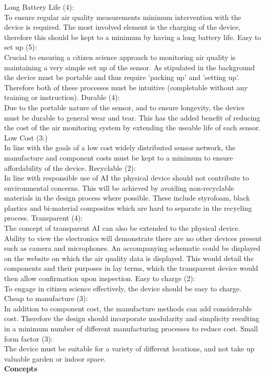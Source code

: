Long Battery Life (4):\\
To ensure regular air quality measurements minimum intervention with the device is required. The most involved element is the charging of the device, therefore this should be kept to a minimum by having a long battery life.
\vskip 0.1in
Easy to set up (5):\\
Crucial to ensuring a citizen science approach to monitoring air quality is maintaining a very simple set up of the sensor. As stipulated in the background the device must be portable and thus require 'packing up' and 'setting up'. Therefore both of these processes must be intuitive (completable without any training or instruction).
\vskip 0.1in
Durable (4):\\
Due to the portable nature of the sensor, and to ensure longevity, the device must be durable to general wear and tear. This has the added benefit of reducing the cost of the air monitoring system by extending the useable life of each sensor.
\vskip 0.1in
Low Cost (3:)\\
In line with the goals of a low cost widely distributed sensor network, the manufacture and component costs must be kept to a minimum to ensure affordability of the device.
\vskip 0.1in
Recyclable (2):\\
In line with responsible use of AI the physical device should not contribute to environmental concerns. This will be achieved by avoiding non-recyclable materials in the design process where possible. These include styrofoam, black plastics and bi-material composites which are hard to separate in the recycling process.
\vskip 0.1in
Transparent (4):\\
The concept of transparent AI can also be extended to the physical device. Ability to view the electronics will demonstrate there are no other devices present such as camera and microphones. An accompanying schematic could be displayed on the website on which the air quality data is displayed. This would detail the components and their purposes in lay terms, which the transparent device would then allow confirmation upon inspection.
\vskip 0.1in
Easy to charge (2):\\
To engage in citizen science effectively, the device should be easy to charge.
\vskip 0.1in
Cheap to manufacture (3):\\
In addition to component cost, the manufacture methods can add considerable cost. Therefore the design should incorporate modularity and simplicity resulting in a minimum number of different manufacturing processes to reduce cost.
\vskip 0.1in
Small form factor (3):\\
The device must be suitable for a variety of different locations, and not take up valuable garden or indoor space.\\
\vskip 0.1in
\textbf{Concepts}\\


